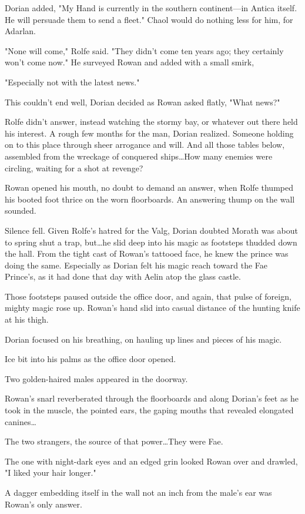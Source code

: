 Dorian added, "My Hand is currently in the southern continent---in Antica itself.
He will persuade them to send a fleet."
Chaol would do nothing less for him, for Adarlan.

"None will come," Rolfe said.
"They didn't come ten years ago; they certainly won't come now."
He surveyed Rowan and added with a small smirk,

"Especially not with the latest news."

This couldn't end well, Dorian decided as Rowan asked flatly, "What news?"

Rolfe didn't answer, instead watching the stormy bay, or whatever out there held his interest.
A rough few months for the man, Dorian realized.
Someone holding on to this place through sheer arrogance and will.
And all those tables below, assembled from the wreckage of conquered ships\ldots How many enemies were circling, waiting for a shot at revenge?

Rowan opened his mouth, no doubt to demand an answer, when Rolfe thumped his booted foot thrice on the worn floorboards.
An answering thump on the wall sounded.

Silence fell.
Given Rolfe's hatred for the Valg, Dorian doubted Morath was about to spring shut a trap, but\ldots he slid deep into his magic as footsteps thudded down the hall.
From the tight cast of Rowan's tattooed face, he knew the prince was doing the same.
Especially as Dorian felt his magic reach toward the Fae Prince's, as it had done that day with Aelin atop the glass castle.

Those footsteps paused outside the office door, and again, that pulse of foreign, mighty magic rose up.
Rowan's hand slid into casual distance of the hunting knife at his thigh.

Dorian focused on his breathing, on hauling up lines and pieces of his magic.

Ice bit into his palms as the office door opened.

Two golden-haired males appeared in the doorway.

Rowan's snarl reverberated through the floorboards and along Dorian's feet as he took in the muscle, the pointed ears, the gaping mouths that revealed elongated canines\ldots{}

The two strangers, the source of that power\ldots They were Fae.

The one with night-dark eyes and an edged grin looked Rowan over and drawled, "I liked your hair longer."

A dagger embedding itself in the wall not an inch from the male's ear was Rowan's only answer.
